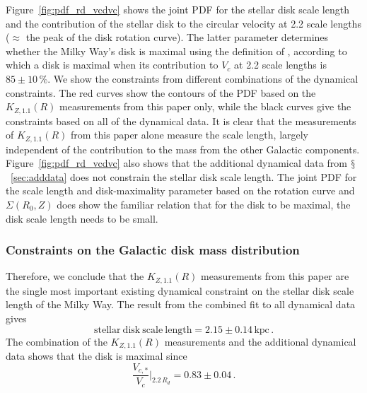\documentclass{emulateapj}
\renewcommand{\figurename}{Figure}
\newcommand{\sectionname}{$\mathsection$}
\newcommand{\kpc}{\ensuremath{\,\mathrm{kpc}}}
\newcommand{\kzoneone}{\ensuremath{K_{Z,1.1}}}
\begin{document}
\begin{figure}[t!]
\end{figure}

\figurename~\ref{fig:pdf_rd_vcdvc} shows the joint PDF for the stellar
disk scale length and the contribution of the stellar disk to the
circular velocity at 2.2 scale lengths ($\approx$ the peak of the disk
rotation curve). The latter parameter determines whether the Milky
Way's disk is maximal using the definition of \citet{Sackett97a},
according to which a disk is maximal when its contribution to $V_c$ at
2.2 scale lengths is $85\pm10\,\%$. We show the constraints from
different combinations of the dynamical constraints. The red curves
show the contours of the PDF based on the $\kzoneone(R)$ measurements
from this paper only, while the black curves give the constraints
based on all of the dynamical data. It is clear that the measurements
of $\kzoneone(R)$ from this paper alone measure the scale length,
largely independent of the contribution to the mass from the other
Galactic components. \figurename~\ref{fig:pdf_rd_vcdvc} also shows
that the additional dynamical data from \sectionname~\ref{sec:adddata}
does not constrain the stellar disk scale length. The joint PDF for
the scale length and disk-maximality parameter based on the rotation
curve and $\Sigma(R_0,Z)$ does show the familiar relation that for the
disk to be maximal, the disk scale length needs to be small.


\subsubsection{Constraints on the Galactic disk mass distribution}

Therefore, we conclude that the $\kzoneone(R)$ measurements from this
paper are the single most important existing dynamical constraint on
the stellar disk scale length of the Milky Way. The result from the
combined fit to all dynamical data gives
\begin{equation}
  \mathrm{stellar\ disk\ scale\ length} = 2.15\pm0.14\kpc\,.
\end{equation}
The combination of the $\kzoneone(R)$ measurements and the additional
dynamical data shows that the disk is maximal since
\begin{equation}
  \frac{V_{c,*}}{V_c}\Bigg|_{2.2\,R_d} = 0.83\pm0.04\,.
\end{equation}
\end{document}
